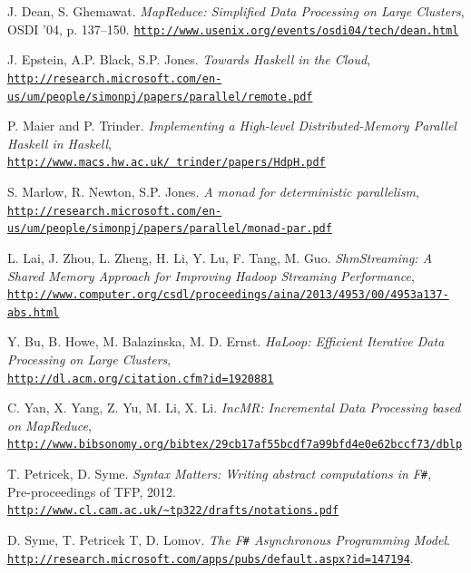 \documentclass[9pt,a4paper]{article}
\newcommand{\fsharp}{F\texttt \#}
\newcommand{\samehref}[1]{\href{#1}{\texttt{#1}}}
\begin{document}
\begin{thebibliography}{9}

	 J. Dean, S. Ghemawat. 
		\emph{MapReduce: Simplified Data Processing on Large Clusters}, \\
		OSDI '04, p. 137--150.
		\samehref{http://www.usenix.org/events/osdi04/tech/dean.html}

	 J. Epstein, A.P. Black, S.P. Jones.
		\emph{Towards Haskell in the Cloud},\\
		\samehref{http://research.microsoft.com/en-us/um/people/simonpj/papers/parallel/remote.pdf}
		
	 P. Maier and P. Trinder.
		\emph{Implementing a High-level Distributed-Memory Parallel Haskell in Haskell},\\
		\samehref{http://www.macs.hw.ac.uk/~trinder/papers/HdpH.pdf}
		
	 S. Marlow, R. Newton, S.P. Jones.
		\emph{A monad for deterministic parallelism},\\
		\samehref{http://research.microsoft.com/en-us/um/people/simonpj/papers/parallel/monad-par.pdf}
		
	 L. Lai, J. Zhou, L. Zheng, H. Li, Y. Lu, F. Tang, M. Guo.
		\emph{ShmStreaming: A Shared Memory Approach for Improving Hadoop Streaming Performance},\\
		\samehref{http://www.computer.org/csdl/proceedings/aina/2013/4953/00/4953a137-abs.html}
			
	 Y. Bu, B. Howe, M. Balazinska, M. D. Ernst.
		\emph{HaLoop: Efficient Iterative Data Processing on Large Clusters},\\
		\samehref{http://dl.acm.org/citation.cfm?id=1920881}
		
	 C. Yan, X. Yang, Z. Yu, M. Li, X. Li.
		\emph{IncMR: Incremental Data Processing based on MapReduce},\\
		\samehref{http://www.bibsonomy.org/bibtex/29cb17af55bcdf7a99bfd4e0e62bccf73/dblp}
	
	 T. Petricek, D. Syme.
		\emph{Syntax Matters: Writing abstract computations in \fsharp},\\
		Pre-proceedings of TFP, 2012.\\
		\href{http://www.cl.cam.ac.uk/~tp322/drafts/notations.pdf}
			{\texttt{http://www.cl.cam.ac.uk/{\textasciitilde}tp322/drafts/notations.pdf}}

	 D. Syme, T. Petricek T, D. Lomov.
		\emph{The \fsharp{} Asynchronous Programming Model}. \\ 
		\samehref{http://research.microsoft.com/apps/pubs/default.aspx?id=147194}.
		

\end{thebibliography}
\end{document}
